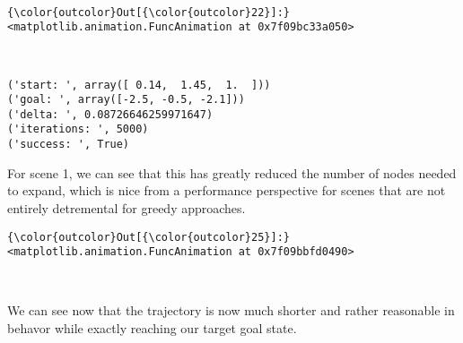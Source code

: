 \documentclass{article}
\begin{document}
    \begin{center}
    \end{center}
    { \hspace*{\fill} \\}
    

            \begin{Verbatim}[commandchars=\\\{\}]
{\color{outcolor}Out[{\color{outcolor}22}]:} <matplotlib.animation.FuncAnimation at 0x7f09bc33a050>
\end{Verbatim}
        
    \begin{center}
    \end{center}
    { \hspace*{\fill} \\}
    




    \begin{Verbatim}[commandchars=\\\{\}]
('start: ', array([ 0.14,  1.45,  1.  ]))
('goal: ', array([-2.5, -0.5, -2.1]))
('delta: ', 0.08726646259971647)
('iterations: ', 5000)
('success: ', True)
    \end{Verbatim}

    For scene 1, we can see that this has greatly reduced the number of
nodes needed to expand, which is nice from a performance perspective for
scenes that are not entirely detremental for greedy approaches.



            \begin{Verbatim}[commandchars=\\\{\}]
{\color{outcolor}Out[{\color{outcolor}25}]:} <matplotlib.animation.FuncAnimation at 0x7f09bbfd0490>
\end{Verbatim}
        
    \begin{center}
    \end{center}
    { \hspace*{\fill} \\}
    
    We can see now that the trajectory is now much shorter and rather
reasonable in behavor while exactly reaching our target goal state.
\end{document}
